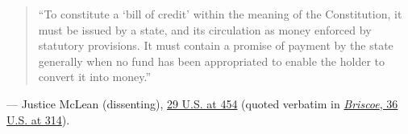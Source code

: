 \documentclass[12pt]{article}
\begin{document}
\begin{quote}
``To constitute a `bill of credit' within the meaning of the Constitution, it must be issued by a state, and its circulation as money enforced by statutory provisions. It must contain a promise of payment by the state generally when no fund has been appropriated to enable the holder to convert it into money.''
\end{quote}
\noindent --- Justice McLean (dissenting), \href{https://supreme.justia.com/cases/federal/us/29/410/}{29 U.S. at 454} (quoted verbatim in \href{https://supreme.justia.com/cases/federal/us/36/257/}{\textit{Briscoe}, 36 U.S. at 314}).
\end{document}
